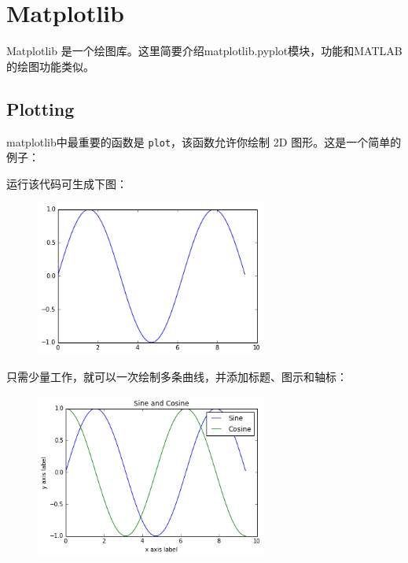 \section{Matplotlib}


Matplotlib 是一个绘图库。这里简要介绍matplotlib.pyplot模块，功能和MATLAB的绘图功能类似。

\subsection{Plotting}


matplotlib中最重要的函数是 \lstinline|plot|，该函数允许你绘制 2D 图形。这是一个简单的例子：



运行该代码可生成下图：
\begin{figure}[htbp]
        \centering
        \includegraphics[width=3in]{images/sine.png}
\end{figure}




只需少量工作，就可以一次绘制多条曲线，并添加标题、图示和轴标：


\begin{figure}[htbp]
        \centering
        \includegraphics[width=3in]{images/sine_cosine.png}
\end{figure}


